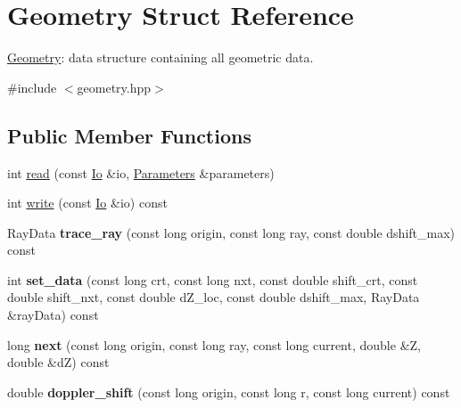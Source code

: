 \hypertarget{structGeometry}{}\section{Geometry Struct Reference}
\label{structGeometry}


\mbox{\hyperlink{structGeometry}{Geometry}}\+: data structure containing all geometric data.  




{\ttfamily \#include $<$geometry.\+hpp$>$}

\subsection*{Public Member Functions}
\begin{DoxyCompactItemize}
\item 
int \mbox{\hyperlink{structGeometry_a129743f34789020e93923a15f85dcfc9}{read}} (const \mbox{\hyperlink{structIo}{Io}} \&io, \mbox{\hyperlink{classParameters}{Parameters}} \&parameters)
\item 
int \mbox{\hyperlink{structGeometry_a9cb010d7e27cdbdce9a552ad1e7ffa3c}{write}} (const \mbox{\hyperlink{structIo}{Io}} \&io) const
\item 
\mbox{\label{structGeometry_ada5407ff5d7e2506061d8e3b535edbce}} 
Ray\+Data {\bfseries trace\+\_\+ray} (const long origin, const long ray, const double dshift\+\_\+max) const
\item 
\mbox{\label{structGeometry_a83eaca7c81e577e6acceff613d8dda07}} 
int {\bfseries set\+\_\+data} (const long crt, const long nxt, const double shift\+\_\+crt, const double shift\+\_\+nxt, const double d\+Z\+\_\+loc, const double dshift\+\_\+max, Ray\+Data \&ray\+Data) const
\item 
\mbox{\label{structGeometry_a15635ef307c4a5cf3b5c94d2e9dd70ef}} 
long {\bfseries next} (const long origin, const long ray, const long current, double \&Z, double \&dZ) const
\item 
\mbox{\label{structGeometry_a442e01e6c5b87939670ade6ae6836053}} 
double {\bfseries doppler\+\_\+shift} (const long origin, const long r, const long current) const
\end{DoxyCompactItemize}

